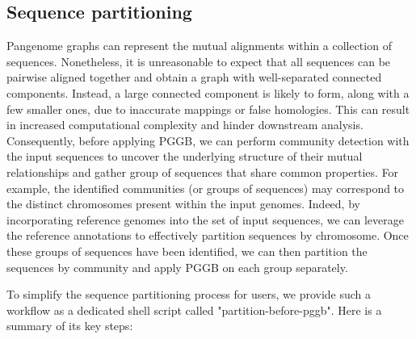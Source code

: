 \documentclass[pdflatex,mathphys]{jnl}%
\theoremstyle{thmstyleone}%
\theoremstyle{thmstyletwo}%
\theoremstyle{thmstylethree}%
\begin{document}
\begin{appendices}
\subsection{Sequence partitioning}
\label{sec:partition}

Pangenome graphs can represent the mutual alignments within a collection of sequences. Nonetheless, it is unreasonable to expect that all sequences can be pairwise aligned together and obtain a graph with well-separated connected components. Instead, a large connected component is likely to form, along with a few smaller ones, due to inaccurate mappings or false homologies. This can result in increased computational complexity and hinder downstream analysis. Consequently, before applying PGGB, we can perform community detection with the input sequences to uncover the underlying structure of their mutual relationships and gather group of sequences that share common properties. For example, the identified communities (or groups of sequences) may correspond to the distinct chromosomes present within the input genomes. Indeed, by incorporating reference genomes into the set of input sequences, we can leverage the reference annotations to effectively partition sequences by chromosome. Once these groups of sequences have been identified, we can then partition the sequences by community and apply PGGB on each group separately.

To simplify the sequence partitioning process for users, we provide such a workflow as a dedicated shell script called "partition-before-pggb". Here is a summary of its key steps:


\end{appendices}
\end{document}
